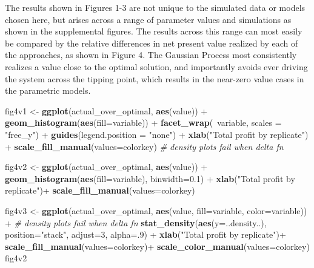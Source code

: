 \documentclass[author-year, review]{elsarticle} %
\newenvironment{Shaded}{}{}
\newcommand{\KeywordTok}[1]{\textcolor[rgb]{0.00,0.44,0.13}{\textbf{{#1}}}}
\newcommand{\DataTypeTok}[1]{\textcolor[rgb]{0.56,0.13,0.00}{{#1}}}
\newcommand{\DecValTok}[1]{\textcolor[rgb]{0.25,0.63,0.44}{{#1}}}
\newcommand{\FloatTok}[1]{\textcolor[rgb]{0.25,0.63,0.44}{{#1}}}
\newcommand{\StringTok}[1]{\textcolor[rgb]{0.25,0.44,0.63}{{#1}}}
\newcommand{\CommentTok}[1]{\textcolor[rgb]{0.38,0.63,0.69}{\textit{{#1}}}}
\newcommand{\NormalTok}[1]{{#1}}
\begin{document}
The results shown in Figures 1-3 are not unique to the simulated data or
models chosen here, but arises across a range of parameter values and
simulations as shown in the supplemental figures. The results across
this range can most easily be compared by the relative differences in
net present value realized by each of the approaches, as shown in Figure
4. The Gaussian Process most consistently realizes a value close to the
optimal solution, and importantly avoids ever driving the system across
the tipping point, which results in the near-zero value cases in the
parametric models.

\begin{Shaded}
\begin{Highlighting}[]
\NormalTok{fig4v1 <- }\KeywordTok{ggplot}\NormalTok{(actual_over_optimal, }\KeywordTok{aes}\NormalTok{(value)) + }\KeywordTok{geom_histogram}\NormalTok{(}\KeywordTok{aes}\NormalTok{(}\DataTypeTok{fill=}\NormalTok{variable)) + }
  \KeywordTok{facet_wrap}\NormalTok{(~variable, }\DataTypeTok{scales =} \StringTok{"free_y"}\NormalTok{)  + }\KeywordTok{guides}\NormalTok{(}\DataTypeTok{legend.position =} \StringTok{"none"}\NormalTok{) +}
  \KeywordTok{xlab}\NormalTok{(}\StringTok{"Total profit by replicate"}\NormalTok{) + }\KeywordTok{scale_fill_manual}\NormalTok{(}\DataTypeTok{values=}\NormalTok{colorkey) }\CommentTok{# density plots fail when delta fn}

\NormalTok{fig4v2 <- }\KeywordTok{ggplot}\NormalTok{(actual_over_optimal, }\KeywordTok{aes}\NormalTok{(value)) + }\KeywordTok{geom_histogram}\NormalTok{(}\KeywordTok{aes}\NormalTok{(}\DataTypeTok{fill=}\NormalTok{variable), }\DataTypeTok{binwidth=}\FloatTok{0.1}\NormalTok{) + }
  \KeywordTok{xlab}\NormalTok{(}\StringTok{"Total profit by replicate"}\NormalTok{)+ }\KeywordTok{scale_fill_manual}\NormalTok{(}\DataTypeTok{values=}\NormalTok{colorkey)}

\NormalTok{fig4v3 <- }\KeywordTok{ggplot}\NormalTok{(actual_over_optimal, }\KeywordTok{aes}\NormalTok{(value, }\DataTypeTok{fill=}\NormalTok{variable, }\DataTypeTok{color=}\NormalTok{variable)) + }\CommentTok{# density plots fail when delta fn}
  \KeywordTok{stat_density}\NormalTok{(}\KeywordTok{aes}\NormalTok{(}\DataTypeTok{y=}\NormalTok{..density..), }\DataTypeTok{position=}\StringTok{"stack"}\NormalTok{, }\DataTypeTok{adjust=}\DecValTok{3}\NormalTok{, }\DataTypeTok{alpha=}\NormalTok{.}\DecValTok{9}\NormalTok{) + }
  \KeywordTok{xlab}\NormalTok{(}\StringTok{"Total profit by replicate"}\NormalTok{)+ }\KeywordTok{scale_fill_manual}\NormalTok{(}\DataTypeTok{values=}\NormalTok{colorkey)+ }\KeywordTok{scale_color_manual}\NormalTok{(}\DataTypeTok{values=}\NormalTok{colorkey)}
\NormalTok{fig4v2}
\end{Highlighting}
\end{Shaded}
\end{document}
